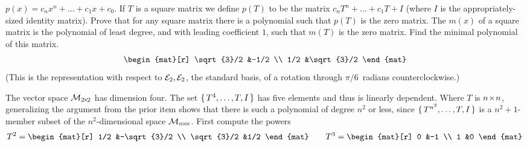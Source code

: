 \begin{exercises}
\begin{exparts}
        \( p(x)=c_nx^n+\dots+c_1x+c_0 \).
        If \( T \) is a square matrix we define \( p(T) \) to be the matrix
        \( c_nT^n+\dots+c_1T+I \)
        (where $I$ is the appropriately-sized identity matrix).
        Prove that for any square matrix there is a polynomial such that
        \( p(T) \) is the zero matrix.
      \partsitem The %
        $m(x)$ of a square matrix is the
        polynomial of least degree, and with leading coefficient \( 1 \),
        such that \( m(T) \) is the zero matrix.
        Find the minimal polynomial of this matrix.
        \begin{equation*}
          \begin{mat}[r]
            \sqrt{3}/2  &-1/2       \\
            1/2         &\sqrt{3}/2
          \end{mat}
        \end{equation*}
        (This is the representation with respect to ${\cal E}_2,{\cal E}_2$, 
        the standard basis, of a rotation through $\pi/6$~radians
        counterclockwise.)
    \end{exparts}
    \begin{answer} 
      \begin{exparts}
         \partsitem The vector space \( \mathcal{M}_{2 \! \times \! 2} \) has dimension
           four. 
           The set \( \mbox{$\{\,T^4,\dots,T,I\,\}$} \) has five
           elements and thus is linearly dependent.
         \partsitem Where \( T \) is \( n \! \times \! n \), 
           generalizing the argument from the
           prior item shows that there is such a polynomial of degree 
           \( n^2 \) or less,
           since \( \mbox{$\{\,T^{n^2},\dots,T,I\,\}$} \) is a \( n^2+1 \)-member
           subset of the $n^2$-dimensional space $\mathcal{M}_{n \! \times \! n}$.
         \partsitem First compute the powers
           \begin{equation*}
              T^2=
              \begin{mat}[r]
                 1/2         &-\sqrt{3}/2  \\
                 \sqrt{3}/2  &1/2
              \end{mat} 
              \qquad
              T^3=
              \begin{mat}[r]
                 0           &-1           \\
                 1           &0
              \end{mat}

\end{equation*}
\end{exparts}
\end{answer}
\end{exercises}
